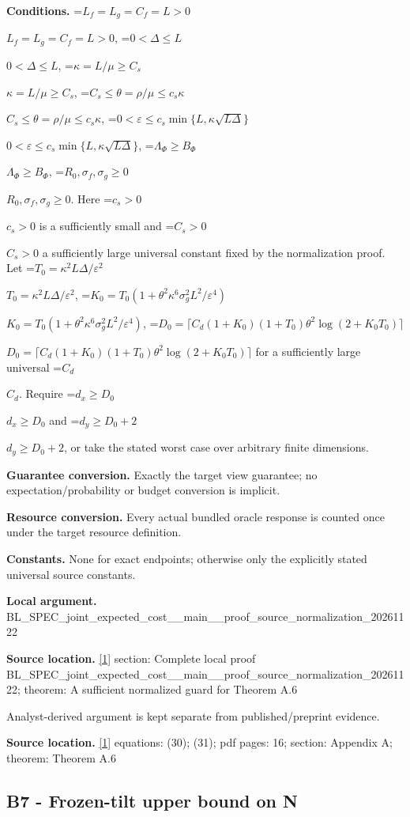 \documentclass[10pt,a4paper]{article}
\newcommand{\AtlasMath}[1]{\par\begingroup\centering\setbox0=\hbox{$\displaystyle #1$}\ifdim\wd0>1.4\linewidth\typeout{ATLAS WIDE FORMULA: \the\wd0}\fi\ifdim\wd0>\linewidth\resizebox{\linewidth}{!}{\box0}\else\box0\fi\par\endgroup}
\newcommand{\AtlasInlineMath}[1]{\begingroup\setbox0=\hbox{$#1$}\ifdim\wd0>.4\linewidth\endgroup\AtlasMath{#1}\else\endgroup$#1$\fi}
\begin{document}
\textbf{Conditions.} \AtlasInlineMath{L_f=L_g=C_f=L>0}, \AtlasInlineMath{0<\Delta\le L}, \AtlasInlineMath{\kappa=L/\mu\ge C_s}, \AtlasInlineMath{C_s\le\theta=\rho/\mu\le c_s\kappa}, \AtlasInlineMath{0<\varepsilon\le c_s\min\{L,\kappa\sqrt{L\Delta}\}}, \AtlasInlineMath{\Lambda_\Phi\ge B_\Phi}, \AtlasInlineMath{R_0,\sigma_f,\sigma_g\ge0}. Here \AtlasInlineMath{c_s>0} is a sufficiently small and \AtlasInlineMath{C_s>0} a sufficiently large universal constant fixed by the normalization proof. Let \AtlasInlineMath{T_0=\kappa^2L\Delta/\varepsilon^2}, \AtlasInlineMath{K_0=T_0(1+\theta^2\kappa^6\sigma_g^2L^2/\varepsilon^4)}, \AtlasInlineMath{D_0=\lceil C_d(1+K_0)(1+T_0)\theta^2\log(2+K_0T_0)\rceil} for a sufficiently large universal \AtlasInlineMath{C_d}. Require \AtlasInlineMath{d_x\ge D_0} and \AtlasInlineMath{d_y\ge D_0+2}, or take the stated worst case over arbitrary finite dimensions.



\textbf{Guarantee conversion.} Exactly the target view guarantee; no expectation/probability or budget conversion is implicit.



\textbf{Resource conversion.} Every actual bundled oracle response is counted once under the target resource definition.



\textbf{Constants.} None for exact endpoints; otherwise only the explicitly stated universal source constants.



\textbf{Local argument.} BL\_SPEC\_joint\_expected\_c\allowbreak{}ost\_\_main\_\_proof\_source\_\allowbreak{}normalization\_20261122



\textbf{Source location.} \href{https://arxiv.org/pdf/2610.03633v2}{[1]} section: Complete local proof BL\_SPEC\_joint\_expected\_c\allowbreak{}ost\_\_main\_\_proof\_source\_\allowbreak{}normalization\_20261122; theorem: A sufficient normalized guard for Theorem A.6



Analyst-derived argument is kept separate from published/preprint evidence.



\textbf{Source location.} \href{https://arxiv.org/pdf/2610.03633v2}{[1]} equations: (30); (31); pdf pages: 16; section: Appendix A; theorem: Theorem A.6



\subsection{B7 - Frozen-tilt upper bound on N}
\end{document}

